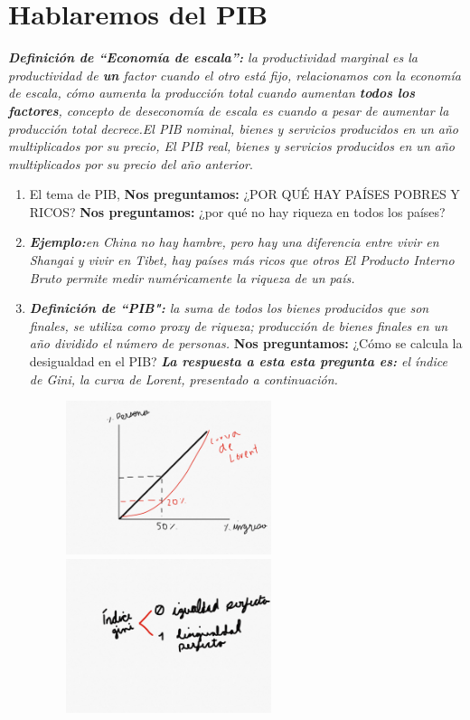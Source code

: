 \section{Hablaremos del PIB}
\emph{\textbf{Definición de ``Economía de escala'':} la productividad marginal es la productividad de \textbf{un} factor cuando el otro está fijo, relacionamos con la economía de escala, cómo aumenta la producción total cuando aumentan  \textbf{todos los factores}, concepto de deseconomía de escala es cuando a pesar de aumentar la producción total decrece.El PIB nominal, bienes y servicios producidos en un año multiplicados por su precio, El PIB real, bienes y servicios producidos en un año multiplicados por su precio del año anterior}. \newline 
\begin{enumerate}
    \item El tema de PIB, \textbf{Nos preguntamos:} ¿POR QUÉ HAY PAÍSES POBRES Y RICOS? \textbf{Nos preguntamos:} ¿por qué no hay riqueza en todos los países?
    \item \emph{\textbf{Ejemplo:}en China no hay hambre, pero hay una diferencia entre vivir en Shangai y vivir en Tibet, hay países más ricos que otros El Producto Interno Bruto permite medir numéricamente la riqueza de un país.}
    \item \emph{\textbf{Definición de ``PIB":} la suma de todos los bienes producidos que son finales, se utiliza como proxy de riqueza; producción de bienes finales en un año dividido el número de personas.} \textbf{Nos preguntamos:} ¿Cómo se calcula la desigualdad en el PIB? \emph{\textbf{La respuesta a esta esta pregunta es: }el índice de Gini, la curva de Lorent, presentado a continuación.}
    \begin{figure}[htbp]
        \centering
        \includegraphics[width=6cm]{Classes/Images/2019-09-16-1.png}
        \includegraphics[width=6cm]{Classes/Images/2019-09-16-2.png}
         \caption{}
        \label{}
    \end{figure} 
    

\end{enumerate}
